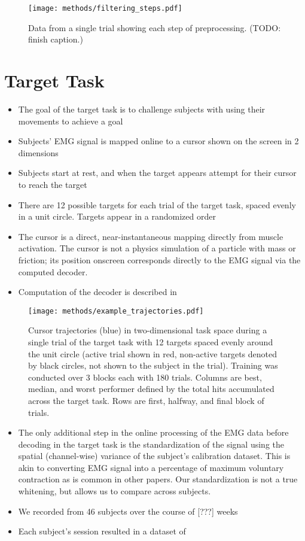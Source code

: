 \documentclass[../main.tex]{subfiles}
\begin{document}
\begin{figure}[tph]
  \centering
  \texttt{[image: methods/filtering\_steps.pdf]}
  \caption[Data filtering steps]{Data from a single trial showing each step of preprocessing. (TODO: finish caption.)}\label{fig:filtering_steps}
\end{figure}


\section{Target Task}


\begin{itemize}
  \item The goal of the target task is to challenge subjects with using their movements to achieve a goal
  \item Subjects' EMG signal is mapped online to a cursor shown on the screen in 2 dimensions
  \item Subjects start at rest, and when the target appears attempt for their cursor to reach the target
  \item There are 12 possible targets for each trial of the target task, spaced evenly in a unit circle. Targets appear in a randomized order
  \item The cursor is a direct, near-instantaneous mapping directly from muscle activation. The cursor is not a physics simulation of a particle with mass or friction; its position onscreen corresponds directly to the EMG signal via the computed decoder.
  \item Computation of the decoder is described in 
\end{itemize}


\begin{figure}[tph]
  \centering
  \texttt{[image: methods/example\_trajectories.pdf]}
  \caption{Cursor trajectories (blue) in two-dimensional task space during a single trial of the target task with 12 targets spaced evenly around the unit circle (active trial shown in red, non-active targets denoted by black circles, not shown to the subject in the trial). Training was conducted over 3 blocks each with 180 trials. Columns are best, median, and worst performer defined by the total hits accumulated across the target task. Rows are first, halfway, and final block of trials.}\label{fig:example_trajectories}
\end{figure}

\begin{itemize}
  \item The only additional step in the online processing of the EMG data before decoding in the target task is the standardization of the signal using the spatial (channel-wise) variance of the subject's calibration dataset. This is akin to converting EMG signal into a percentage of maximum voluntary contraction as is common in other papers. Our standardization is not a true whitening, but allows us to compare across subjects.
  \item We recorded from 46 subjects over the course of [???] weeks 
  \item Each subject's session resulted in a dataset of 
\end{itemize}
\end{document}
